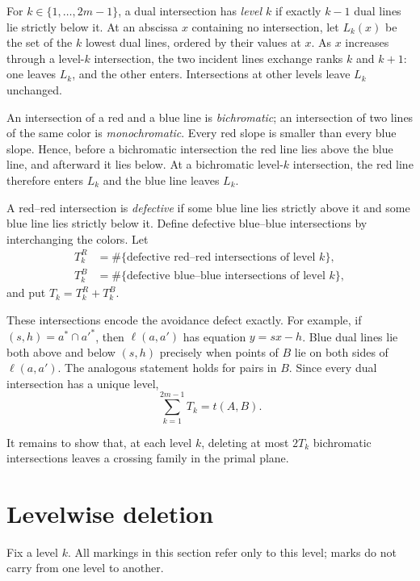 \documentclass[12pt]{article}
\begin{document}
For \(k\in\{1,\ldots,2m-1\}\), a dual intersection has
\emph{level \(k\)} if exactly \(k-1\) dual lines lie strictly below
it. At an abscissa \(x\) containing no intersection, let \(L_k(x)\)
be the set of the \(k\) lowest dual lines, ordered by their values
at \(x\). As \(x\) increases through a level-\(k\) intersection,
the two incident lines exchange ranks \(k\) and \(k+1\): one
leaves \(L_k\), and the other enters. Intersections at other
levels leave \(L_k\) unchanged.

An intersection of a red and a blue line is \emph{bichromatic};
an intersection of two lines of the same color is
\emph{monochromatic}. Every red slope is smaller than every blue
slope. Hence, before a bichromatic intersection the red line lies
above the blue line, and afterward it lies below. At a
bichromatic level-\(k\) intersection, the red line therefore
enters \(L_k\) and the blue line leaves \(L_k\).

A red--red intersection is \emph{defective} if some blue line lies
strictly above it and some blue line lies strictly below it.
Define defective blue--blue intersections by interchanging the
colors. Let
\begin{align*}
 T_k^R&=\#\{\text{defective red--red intersections of level }k\},\\
 T_k^B&=\#\{\text{defective blue--blue intersections of level }k\},
\end{align*}
and put \(T_k=T_k^R+T_k^B\).

These intersections encode the avoidance defect exactly. For example,
if \((s,h)=a^*\cap a'^*\), then \(\ell(a,a')\) has equation
\(y=sx-h\). Blue dual lines lie both above and below \((s,h)\)
precisely when points of \(B\) lie on both sides of \(\ell(a,a')\).
The analogous statement holds for pairs in \(B\). Since every
dual intersection has a unique level,
\begin{equation}
 \sum_{k=1}^{2m-1}T_k=t(A,B).
 \label{eq:sumdefects}
\end{equation}

It remains to show that, at each level \(k\), deleting at most
\(2T_k\) bichromatic intersections leaves a crossing family in the
primal plane.

\section{Levelwise deletion}\label{sec:deletion}

Fix a level \(k\). All markings in this section refer only to this
level; marks do not carry from one level to another.
\end{document}
